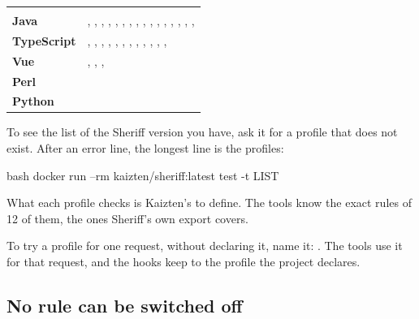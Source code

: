 \documentclass[11pt,a4paper]{article}
\begin{document}
\begin{center}
\begin{tabularx}{\linewidth}{@{\hspace{6pt}}>{\bfseries}p{20mm}L}
\headrow {} &  \\
Java & \textbf{}, , , , , , , , , , , , , , , ,  \\
TypeScript & \textbf{}, , , , , , , , , , , ,  \\
Vue & \textbf{}, , ,  \\
Perl & \textbf{} \\
Python & \textbf{} \\
\end{tabularx}
\end{center}

To see the list of the Sheriff version you have, ask it for a profile that does
not exist. After an error line, the longest  line is the
profiles:

\begin{command}{bash}
docker run --rm kaizten/sheriff:latest test -t LIST
\end{command}

What each profile checks is Kaizten's to define. The tools know the exact rules
of 12 of them, the ones Sheriff's own export covers.

To try a profile for one request, without declaring it, name it:
. The tools use it for that request,
and the hooks keep to the profile the project declares.

\subsection{No rule can be switched off}
\end{document}
